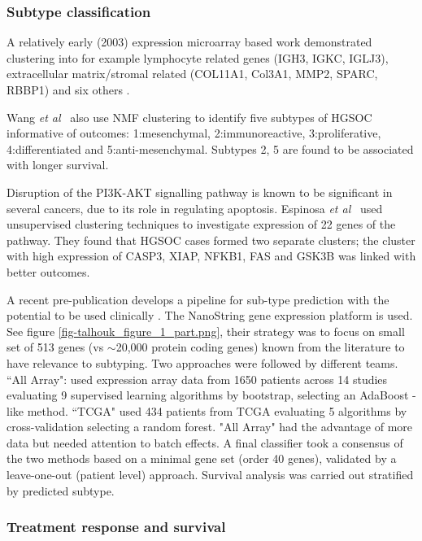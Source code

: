 \documentclass[draft, tikz, 12pt,a4paper,oneside,fleqn]{article}
\newcommand{\etal}{{\em et al\/}}
\begin{document}
\subsubsection{Subtype classification}



A relatively early (2003) expression microarray based work demonstrated clustering into for example lymphocyte related genes (IGH3, IGKC, IGLJ3), extracellular matrix/stromal related (COL11A1, Col3A1, MMP2, SPARC, RBBP1) and six others \cite{Schaner2003}.

Wang \etal\ \cite{Wang2017c} also use NMF clustering to identify five subtypes of HGSOC informative of outcomes: 1:mesenchymal, 2:immunoreactive, 3:proliferative, 4:differentiated and 5:anti-mesenchymal.
Subtypes 2, 5 are found to be associated with longer survival.

Disruption of the PI3K-AKT signalling pathway is known to be significant in several cancers, due to its role in regulating apoptosis.  
Espinosa \etal\ \cite{Espinosa2011} used unsupervised clustering techniques to investigate expression of 22 genes of the pathway.  
They found that HGSOC cases formed two separate clusters; the cluster with high expression of CASP3, XIAP, NFKB1, FAS and GSK3B was linked with better outcomes.

A recent pre-publication develops a pipeline for sub-type prediction with the potential to be used clinically \cite{Talhouk2020}.
The NanoString gene expression platform is used.  See figure \ref{fig-talhouk_figure_1_part.png}, their strategy was to focus on small set of 513 genes (vs $\sim$20,000 protein coding genes) known from the literature to have relevance to subtyping.
Two approaches were followed by different teams.  ``All Array": used expression array data from 1650 patients across 14 studies evaluating 9 supervised learning algorithms by bootstrap, selecting an AdaBoost -like method. ``TCGA" used 434 patients from TCGA evaluating 5 algorithms by cross-validation selecting a random forest.  "All Array" had the advantage of more data but needed attention to batch effects. A final classifier took a consensus of the two methods based on a minimal gene set (order 40 genes), validated by a leave-one-out (patient level) approach.  Survival analysis was carried out stratified by predicted subtype.

\subsubsection{Treatment response and survival}
\end{document}
